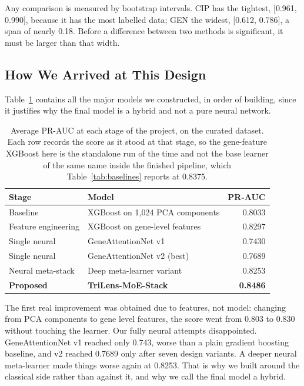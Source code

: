 \documentclass[conference]{IEEEtran}
\begin{document}
Any comparison is measured by bootstrap intervals. CIP has the tightest,
[0.961, 0.990], because it has the most labelled data; GEN the widest,
[0.612, 0.786], a span of nearly 0.18. Before a difference between two methods is
significant, it must be larger than that width.

\subsection{How We Arrived at This Design}

Table~\ref{tab:progress} contains all the major models we constructed, in order of
building, since it justifies why the final model is a hybrid and not a pure neural
network.

\begin{table}[t]
\caption{Average PR-AUC at each stage of the project, on the curated dataset. Each
row records the score as it stood at that stage, so the gene-feature XGBoost here is
the standalone run of the time and not the base learner of the same name inside the
finished pipeline, which Table~\ref{tab:baselines} reports at 0.8375.}
\label{tab:progress}
\centering
\small
\setlength{\tabcolsep}{4pt}
\renewcommand{\arraystretch}{1.15}
\begin{tabular}{|>{\raggedright\arraybackslash}p{1.8cm}|>{\raggedright\arraybackslash}p{4.15cm}|r|}
\hline
\rowcolor{headgrey}
\textbf{Stage} & \textbf{Model} & \textbf{PR-AUC} \\ \hline
Baseline & XGBoost on 1{,}024 PCA components & 0.8033 \\ \hline
Feature engineering & XGBoost on gene-level features & 0.8297 \\ \hline
Single neural & GeneAttentionNet v1 & 0.7430 \\ \hline
Single neural & GeneAttentionNet v2 (best) & 0.7689 \\ \hline
Neural meta-stack & Deep meta-learner variant & 0.8253 \\ \hline
\rowcolor{oursblue}
\textbf{Proposed} & \textbf{TriLens-MoE-Stack} & \textbf{0.8486} \\ \hline
\end{tabular}
\renewcommand{\arraystretch}{1.0}
\end{table}

The first real improvement was obtained due to features, not model: changing from
PCA components to gene level features, the score went from 0.803 to 0.830 without
touching the learner. Our fully neural attempts disappointed. GeneAttentionNet v1 reached only
0.743, worse than a plain gradient boosting baseline, and v2 reached 0.7689 only
after seven design variants. A deeper neural meta-learner made things worse again at
0.8253. That is why we built around the classical side rather than against it, and
why we call the final model a hybrid.
\end{document}

